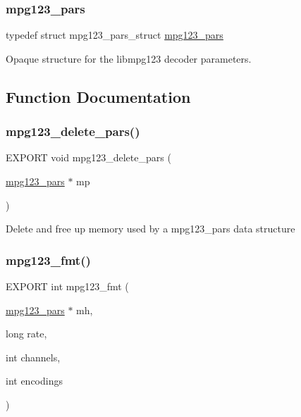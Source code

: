 \subsubsection{\texorpdfstring{mpg123\+\_\+pars}{mpg123\_pars}\hspace{0.1cm}{\footnotesize\ttfamily [2/2]}}
{\footnotesize\ttfamily typedef struct mpg123\+\_\+pars\+\_\+struct \hyperlink{group__mpg123__advpar_ga3983578625af3bb6dc7e3b74d0cab4aa}{mpg123\+\_\+pars}}

Opaque structure for the libmpg123 decoder parameters. 

\subsection{Function Documentation}
\mbox{\label{group__mpg123__advpar_gae2b9963cd5295f736db026dbe2c2e1a3}} 
\subsubsection{\texorpdfstring{mpg123\+\_\+delete\+\_\+pars()}{mpg123\_delete\_pars()}}
{\footnotesize\ttfamily E\+X\+P\+O\+RT void mpg123\+\_\+delete\+\_\+pars (\begin{DoxyParamCaption}\item[{\hyperlink{group__mpg123__advpar_ga3983578625af3bb6dc7e3b74d0cab4aa}{mpg123\+\_\+pars} $\ast$}]{mp }\end{DoxyParamCaption})}

Delete and free up memory used by a mpg123\+\_\+pars data structure \mbox{\label{group__mpg123__advpar_ga0a4e4931437176e1365a98d5af921a6a}} 
\subsubsection{\texorpdfstring{mpg123\+\_\+fmt()}{mpg123\_fmt()}}
{\footnotesize\ttfamily E\+X\+P\+O\+RT int mpg123\+\_\+fmt (\begin{DoxyParamCaption}\item[{\hyperlink{group__mpg123__advpar_ga3983578625af3bb6dc7e3b74d0cab4aa}{mpg123\+\_\+pars} $\ast$}]{mh,  }\item[{long}]{rate,  }\item[{int}]{channels,  }\item[{int}]{encodings }\end{DoxyParamCaption})}

